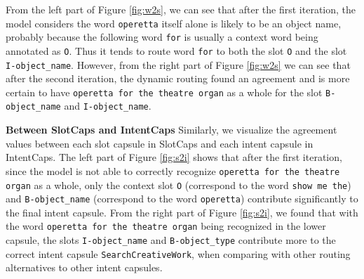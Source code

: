 From the left part of Figure \ref{fig:w2s}, we can see that after the first iteration, the model considers the word \texttt{operetta} itself alone is likely to be an object name, probably because the following word \texttt{for} is usually a context word being annotated as \texttt{O}. Thus it tends to route word \texttt{for} to both the slot \texttt{O} and the slot \texttt{I-object\_name}. However, from the right part of Figure \ref{fig:w2s} we can see that after the second iteration, the dynamic routing found an agreement and is more certain to have \texttt{operetta for the theatre organ} as a whole for the slot \texttt{B-object\_name} and \texttt{I-object\_name}.

\textbf{Between SlotCaps and IntentCaps} Similarly, we visualize the agreement values between each slot capsule in SlotCaps and each intent capsule in IntentCaps.
The left part of Figure \ref{fig:s2i} shows that after the first iteration, since the model is not able to correctly recognize \texttt{operetta for the theatre organ} as a whole, only the context slot \texttt{O} (correspond to the word \texttt{show me the}) and \texttt{B-object\_name} (correspond to the word \texttt{operetta}) contribute significantly to the final intent capsule. From the right part of Figure \ref{fig:s2i}, we found that with the word  \texttt{operetta for the theatre organ} being recognized in the lower capsule, the slots \texttt{I-object\_name} and \texttt{B-object\_type} contribute more to the correct intent capsule \texttt{SearchCreativeWork}, when comparing with other routing alternatives to other intent capsules.